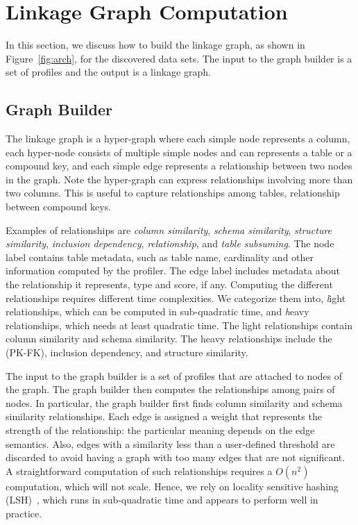 \section{Linkage Graph Computation}
\label{sec:stitching}
In this section, we discuss how to build the linkage graph, as shown in
Figure~\ref{fig:arch}, for the discovered data sets. The input to the graph
builder is a set of profiles and the output is a linkage graph.

\subsection{Graph Builder}
\label{subsec:graphbuild}

The linkage graph is a hyper-graph where each simple node represents a column, each hyper-node consists of multiple simple nodes and can represents a table or a compound key, and each simple edge represents a relationship between two nodes in the graph. Note the hyper-graph can express relationships involving more than two columns. This is useful to capture relationships among tables, \eg \pkfk relationship between compound keys.

Examples of relationships are 
\emph{column similarity}, 
\emph{schema similarity}, 
\emph{structure similarity}, %
\emph{inclusion dependency}, 
\emph{\pkfk relationship}, and
\emph{table subsuming}. 
The node label contains table metadata, such as table name, cardinality and
other information computed by the profiler. The edge label includes metadata
about the relationship it represents, \eg type and score, if any. Computing
the different relationships requires different time complexities. We 
categorize them into, {\textit light relationships}, which can be computed in
sub-quadratic time, and {\textit heavy relationships}, which needs at least
quadratic time. The light relationships contain column similarity and schema
similarity. The heavy relationships include the \pkfk (PK-FK), inclusion dependency, and structure similarity. 

The input to the graph builder is a set of profiles that are attached to nodes
of the graph.  The graph builder then computes the relationships among pairs of
nodes. In particular, the graph builder first finds column similarity and
schema similarity relationships.  Each edge is assigned a weight that represents
the strength of the relationship: the particular meaning depends on the edge
semantics.  Also, edges with a similarity less than a user-defined threshold are
discarded to avoid having a graph with too many edges that are not significant.
A straightforward computation of such relationships requires a $O(n^2)$
computation, which will not scale.  Hence, we rely on locality sensitive hashing
(LSH)~\cite{DBLP:conf/compgeom/DatarIIM04}, which runs in sub-quadratic time
and appears to perform well in practice.

